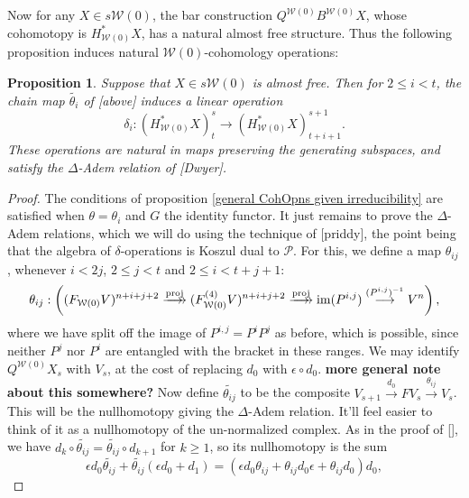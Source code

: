 \documentclass[11pt]{amsart}
\theoremstyle{plain}
\newtheorem{prop}[thm]{Proposition}
\theoremstyle{definition}
\DeclareMathOperator{\im}{im}
\renewcommand{\to}{\longrightarrow}
\newcommand{\calW}{\mathcal{W}}
\newcommand{\calP}{\mathcal{P}}
\theoremstyle{plain}
\newcommand{\Palg}{{\calP}}
\newcommand{\deltaalg}{\Delta} %
\begin{document}
\begin{Cohomology operations for all unstable Lie algebras}
Now for any $X\in s\calW(0)$, the bar construction $Q^{\calW(0)}B^{\calW(0)}X$, whose cohomotopy is $H^*_{\calW(0)}X$, has a natural almost free structure. Thus the following proposition induces natural $\calW(0)$-cohomology operations:
\begin{prop}\label{operations on goerss homology}
Suppose that $X\in s\calW(0)$ is almost free. Then for $2\leq i <t$, the chain map $\widetilde{\theta_i}$ of [above] induces a linear operation
\[\delta_i:(H^*_{\calW(0)}X)^{s}_t\to (H^*_{\calW(0)}X)^{s+1}_{t+i+1}.\] 
These operations are natural in maps preserving the generating subspaces, and satisfy the $\deltaalg$-Adem relation of [Dwyer].
\end{prop}
\begin{proof}
The conditions of proposition \ref{general CohOpns given irreducibility} are satisfied when $\theta=\theta_i$ and $G$ the identity functor. It just remains to prove the $\deltaalg$-Adem relations, which we will do using the technique of [priddy], the point being that the algebra of $\delta$-operations is Koszul dual to $\Palg$. For this, we define a map $\theta_{ij}$, whenever $i<2j$, $2\leq j<t$ and $2\leq i<t+j+1$:
\[\theta_{ij}:\left((F_{\calW(0)}V)^{n+i+j+2}\overset{\textup{proj}}{\makebox[.06ex][l]{$\to$}\to} (F_{\calW(0)}^{(4)}V)^{n+i+j+2}\overset{\textup{proj}}{\makebox[.06ex][l]{$\to$}\to} \im (P^{i,j})\overset{(P^{i,j})^{-1}}{\to}V^{n}\right),\]
where we have split off the image of 
$P^{i,j}=P^iP^j$ %
as before, which is possible, since neither $P^j$ nor $P^i$ are entangled with the bracket in these ranges. We may identify $Q^{\calW(0)}X_s$ with $V_s$, at the cost of replacing $d_0$ with $\epsilon\circ d_0$. \textbf{more general note about this somewhere?} Now define $\widetilde{\theta_{ij}}$ to be the composite $V_{s+1}\overset{d_0}{\to}FV_s\overset{\theta_{ij}}{\to}V_s$. This will be the nullhomotopy giving the $\deltaalg$-Adem relation. It'll feel easier to think of it as a nullhomotopy of the un-normalized complex. As in the proof of [], we have $d_k\circ\widetilde{\theta_{ij}}=\widetilde{\theta_{ij}}\circ d_{k+1}$ for $k\geq1$, so its nullhomotopy is the sum \[\epsilon d_0\widetilde{\theta_{ij}}+\widetilde{\theta_{ij}}(\epsilon d_0+d_1)=(\epsilon d_0\theta_{ij}+\theta_{ij}d_0\epsilon+\theta_{ij}d_0)d_0,\]

\end{proof}
\end{Cohomology operations for all unstable Lie algebras}
\end{document}
